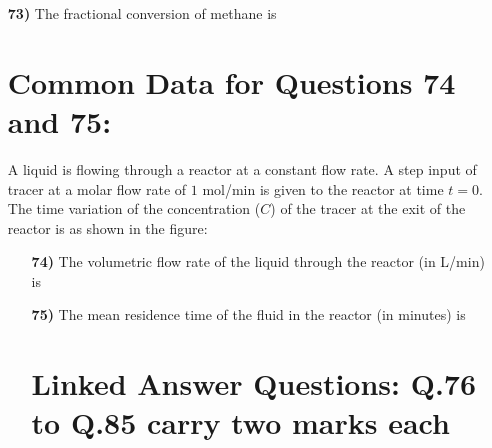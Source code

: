 \documentclass[journal,12pt,onecolumn]{IEEEtran}
\theoremstyle{remark}
\begin{document}
\begin{enumerate}
\item [\textbf{73)}] The fractional conversion of methane is
\hfill{}
\begin{enumerate}
\end{enumerate}

\section*{Common Data for Questions 74 and 75:}
A liquid is flowing through a reactor at a constant flow rate. A step input of tracer at a molar flow rate of $1$ mol/min is given to the reactor at time $t = 0$. The time variation of the concentration ($C$) of the tracer at the exit of the reactor is as shown in the figure:
\begin{enumerate}
\item[\textbf{74)}] The volumetric flow rate of the liquid through the reactor (in L/min) is
\hfill{}
\begin{enumerate}
\end{enumerate}

\item[\textbf{75)}] The mean residence time of the fluid in the reactor (in minutes) is
\hfill{}
\begin{enumerate}
\end{enumerate}

\section*{Linked Answer Questions: Q.76 to Q.85 carry two marks each}


\end{enumerate}
\end{enumerate}
\end{document}
